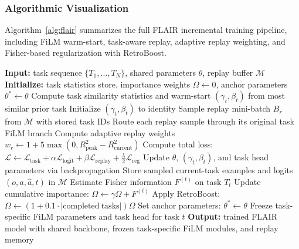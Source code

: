 \documentclass[3p,times,procedia]{elsarticle}
\begin{document}
\subsubsection{Algorithmic Visualization}

Algorithm~\ref{alg:flair} summarizes the full FLAIR incremental training pipeline, including FiLM warm-start, task-aware replay, adaptive replay weighting, and Fisher-based regularization with RetroBoost.

\begin{algorithm}[t]
\caption{FLAIR Incremental Training Procedure}
\label{alg:flair}
\begin{algorithmic}[1]
\STATE \textbf{Input:} task sequence $\{T_1, \ldots, T_N\}$, shared parameters $\theta$, replay buffer $\mathcal{M}$
\STATE \textbf{Initialize:} task statistics store, importance weights $\Omega \leftarrow 0$, anchor parameters $\theta^* \leftarrow \theta$
        \STATE Compute task similarity statistics and warm-start $(\gamma_t, \beta_t)$ from most similar prior task
    \ELSE
        \STATE Initialize $(\gamma_t, \beta_t)$ to identity
    \ENDIF
        \STATE Sample replay mini-batch $B_r$ from $\mathcal{M}$ with stored task IDs
        \STATE Route each replay sample through its original task FiLM branch
        \STATE Compute adaptive replay weights $w_r \leftarrow 1 + 5\max(0, R^2_{\mathrm{peak}} - R^2_{\mathrm{current}})$
        \STATE Compute total loss:
        \STATE \hspace{1.0em}$\mathcal{L} \leftarrow \mathcal{L}_{\mathrm{task}} + \alpha\mathcal{L}_{\mathrm{logit}} + \beta\mathcal{L}_{\mathrm{replay}} + \frac{\lambda}{2}\mathcal{L}_{\mathrm{reg}}$
        \STATE Update $\theta$, $(\gamma_t, \beta_t)$, and task head parameters via backpropagation
        \STATE Store sampled current-task examples and logits $(o, a, \hat{a}, t)$ in $\mathcal{M}$
    \ENDFOR
    \STATE Estimate Fisher information $F^{(t)}$ on task $T_t$
    \STATE Update cumulative importance: $\Omega \leftarrow \gamma\Omega + F^{(t)}$
    \STATE Apply RetroBoost: $\Omega \leftarrow (1 + 0.1\cdot |\mathrm{completed\ tasks}|)\Omega$
    \STATE Set anchor parameters: $\theta^* \leftarrow \theta$
    \STATE Freeze task-specific FiLM parameters and task head for task $t$
\ENDFOR
\STATE \textbf{Output:} trained FLAIR model with shared backbone, frozen task-specific FiLM modules, and replay memory
\end{algorithmic}
\end{algorithm}
\end{document}
